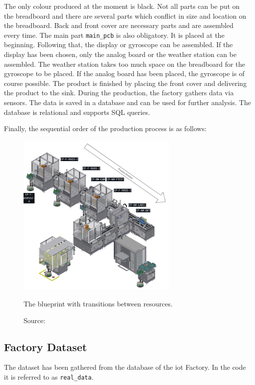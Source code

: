 The only colour produced at the moment is black. Not all parts can be put on the breadboard and there are several parts which conflict in size and location on the breadboard. Back and front cover are necessary parts and are assembled every time. The main part \texttt{main\_pcb} is also obligatory. It is placed at the beginning. Following that, the display or gyroscope can be assembled. If the display has been chosen, only the analog board or the weather station can be assembled. The weather station takes too much space on the breadboard for the gyroscope to be placed. If the analog board has been placed, the gyroscope is of course possible. The product is finished by placing the front cover and delivering the product to the sink. During the production, the factory gathers data via sensors. The data is saved in a database and can be used for further analysis. The database is relational and supports SQL queries.

Finally, the sequential order of the production process is as follows:

\begin{figure}[H]
  \centering
  \includegraphics[width=0.7\textwidth]{figures/processdirection.png}
  \caption[Production Process]{The blueprint with transitions between resources.}
  \label{fig:transitions}
  \caption*{Source: \autocite{IoTFactory2024}}
\end{figure}

\subsection*{Factory Dataset}

The dataset has been gathered from the database of the \gls{iot} Factory. In the code it is referred to as \texttt{real\_data}.


